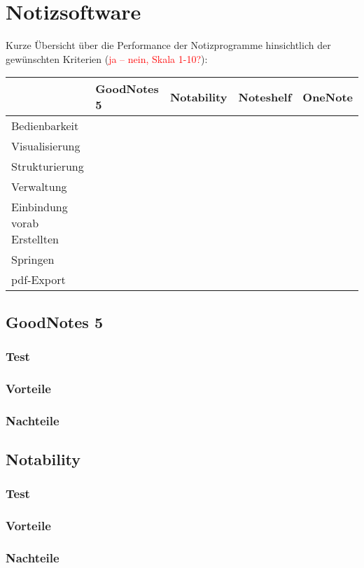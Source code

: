 \documentclass[parskip=off,index=totocnumbered]{scrreprt}
\begin{document}
\chapter{Notizsoftware}
Kurze Übersicht über die Performance der Notizprogramme hinsichtlich der gewünschten Kriterien (\textcolor{red}{ja -- nein, Skala 1-10?}):
\renewcommand*{\arraystretch}{1.2} 
\begin{longtable}{>{\centering \arraybackslash}p{3.2cm}>{\centering \arraybackslash}p{2.2cm}>{\centering \arraybackslash}p{2.2cm}>{\centering \arraybackslash}p{2.2cm}>{\centering \arraybackslash}p{2.2cm}} \toprule
& GoodNotes 5 & Notability & Noteshelf & OneNote \\  \midrule
Bedienbarkeit & & & & \\
Visualisierung & & & & \\
Strukturierung & & & & \\
Verwaltung & & & & \\
Einbindung vorab Erstellten & & & & \\
Springen & & & & \\
pdf-Export & & & & \\ \bottomrule
\end{longtable}

\section{GoodNotes 5}
\subsection{Test}
\subsection{Vorteile}
\subsection{Nachteile}

\section{Notability}
\subsection{Test}
\subsection{Vorteile}
\subsection{Nachteile}
\end{document}
